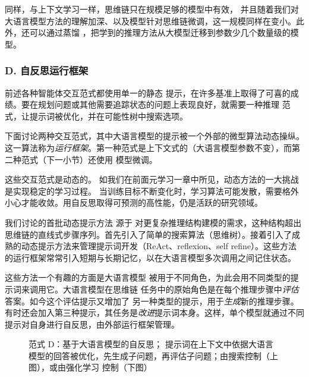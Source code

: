 同样，与上下文学习一样，思维链只在规模足够的模型中有效，
并且随着我们对大语言模型方法的理解加深、以及模型针对思维链微调，这一规模同样在变小。此外，还可以通过蒸馏 \citep{li-etal-2023-symbolic}，把学到的推理方法从大模型迁移到参数少几个数量级的模型。




\subsubsection{D. 自反思运行框架}
前述各种智能体交互范式都使用单一的静态
提示，在许多基准上取得了可喜的成绩。要在规划问题或其他需要追踪状态的问题上表现良好，就需要一种推理
范式，让提示词被优化，并在可能性树中搜索选项。%

下面讨论两种交互范式，其中大语言模型的提示被一个外部的微型算法动态操纵。这一算法称为{\em 运行框架}。第一种范式是上下文式的（大语言模型参数不变），而第二种范式（下一小节）还使用
模型微调。

这些交互范式是动态的。
如我们在前面元学习一章中所见，动态方法的一大挑战是实现稳定的学习过程。
当训练目标不断变化时，学习算法可能发散，需要格外小心才能收敛。用自反思取得可预测的高性能，仍是活跃的研究领域。

我们讨论的首批动态提示方法
源于
对更复杂推理结构建模的需求，这种结构超出思维链的直线式步骤序列。首先引入了简单的搜索算法（思维树）。接着引入了成熟的动态提示方法来管理提示词开发（ReAct、reflexion、self refine）。这些方法的运行框架常常引入短期与长期记忆，以在大语言模型多次调用之间记住状态。

这些方法一个有趣的方面是大语言模型
被用于不同角色，为此会用不同类型的提示词来调用它。大语言模型在思维链
任务中的原始角色是在每个推理步骤中{\em 评估}答案。如今这个评估提示又增加了
另一种类型的提示，用于{\em 生成}新的推理步骤。有时还会加入第三种提示，其任务是{\em 改进}提示词本身。这样，单个模型就通过不同提示对自身进行自反思，由外部运行框架管理。

\begin{figure}
  \begin{center}
    
    \caption{范式 D：基于大语言模型的自反思；
      提示词在上下文中依据大语言模型的回答被优化，先生成子问题，再评估子问题；由搜索控制（上图），或由强化学习
      控制（下图）}\label{fig:rlD} 
  \end{center}
\end{figure}

